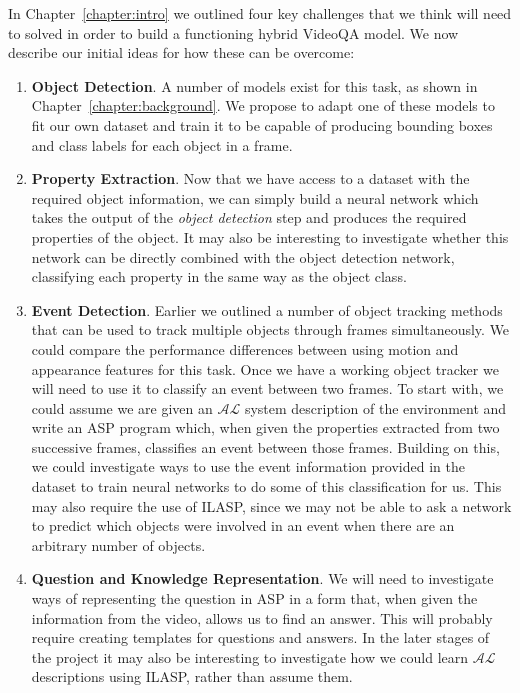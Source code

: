 \documentclass[../interim.tex]{subfiles}
\begin{document}
In Chapter~\ref{chapter:intro} we outlined four key challenges that we think will need to solved in order to build a functioning hybrid VideoQA model. We now describe our initial ideas for how these can be overcome:
\begin{enumerate}
  \item \textbf{Object Detection}. A number of models exist for this task, as shown in Chapter~\ref{chapter:background}. We propose to adapt one of these models to fit our own dataset and train it to be capable of producing bounding boxes and class labels for each object in a frame.

  \item \textbf{Property Extraction}. Now that we have access to a dataset with the required object information, we can simply build a neural network which takes the output of the \textit{object detection} step and produces the required properties of the object. It may also be interesting to investigate whether this network can be directly combined with the object detection network, classifying each property in the same way as the object class.

  \item \textbf{Event Detection}. Earlier we outlined a number of object tracking methods that can be used to track multiple objects through frames simultaneously. We could compare the performance differences between using motion and appearance features for this task. Once we have a working object tracker we will need to use it to classify an event between two frames. To start with, we could assume we are given an $\mathcal{AL}$ system description of the environment and write an ASP program which, when given the properties extracted from two successive frames, classifies an event between those frames. Building on this, we could investigate ways to use the event information provided in the dataset to train neural networks to do some of this classification for us. This may also require the use of ILASP, since we may not be able to ask a network to predict which objects were involved in an event when there are an arbitrary number of objects.

  \item \textbf{Question and Knowledge Representation}. We will need to investigate ways of representing the question in ASP in a form that, when given the information from the video, allows us to find an answer. This will probably require creating templates for questions and answers. In the later stages of the project it may also be interesting to investigate how we could learn $\mathcal{AL}$ descriptions using ILASP, rather than assume them.
\end{enumerate}
\end{document}
